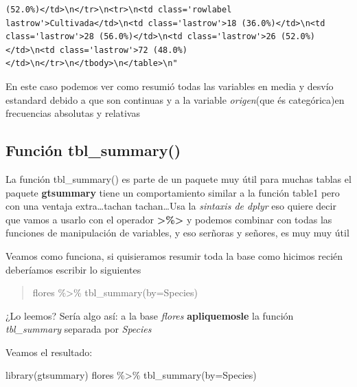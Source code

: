 \documentclass[
]{book}
\newenvironment{Shaded}{\begin{snugshade}}{\end{snugshade}}
\newcommand{\AttributeTok}[1]{\textcolor[rgb]{0.77,0.63,0.00}{#1}}
\newcommand{\FunctionTok}[1]{\textcolor[rgb]{0.00,0.00,0.00}{#1}}
\newcommand{\NormalTok}[1]{#1}
\newcommand{\SpecialCharTok}[1]{\textcolor[rgb]{0.00,0.00,0.00}{#1}}
\begin{document}
\begin{verbatim}
(52.0%)</td>\n</tr>\n<tr>\n<td class='rowlabel lastrow'>Cultivada</td>\n<td class='lastrow'>18 (36.0%)</td>\n<td class='lastrow'>28 (56.0%)</td>\n<td class='lastrow'>26 (52.0%)</td>\n<td class='lastrow'>72 (48.0%)</td>\n</tr>\n</tbody>\n</table>\n"
\end{verbatim}

En este caso podemos ver como resumió todas las variables en media y desvío estandard debido a que son continuas y a la variable \emph{origen}(que és categórica)en frecuencias absolutas y relativas

\hypertarget{funciuxf3n-tbl_summary}{%
\subsection{Función tbl\_summary()}\label{funciuxf3n-tbl_summary}}

La función tbl\_summary() es parte de un paquete muy útil para muchas tablas el paquete \textbf{gtsummary} tiene un comportamiento similar a la función table1 pero con una ventaja extra\ldots tachan tachan\ldots Usa la \emph{sintaxis de dplyr} eso quiere decir que vamos a usarlo con el operador \textbf{\textgreater\%\textgreater{}} y podemos combinar con todas las funciones de manipulación de variables, y eso serñoras y señores, es muy muy útil

Veamos como funciona, si quisieramos resumir toda la base como hicimos recién deberíamos escribir lo siguientes

\begin{quote}
flores \%\textgreater\% tbl\_summary(by=Species)
\end{quote}

¿Lo leemos? Sería algo así: a la base \emph{flores} \textbf{apliquemosle} la función \emph{tbl\_summary} separada por \emph{Species}

Veamos el resultado:

\begin{Shaded}
\begin{Highlighting}[]
\FunctionTok{library}\NormalTok{(gtsummary)}
\NormalTok{flores }\SpecialCharTok{\%\textgreater{}\%} \FunctionTok{tbl\_summary}\NormalTok{(}\AttributeTok{by=}\NormalTok{Species)}
\end{Highlighting}
\end{Shaded}
\end{document}
